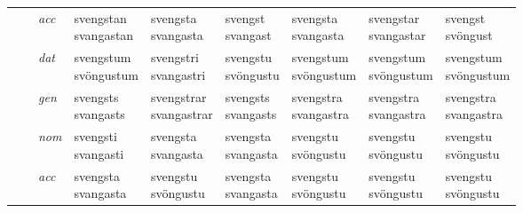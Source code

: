 \begin{longtable}{l>{\footnotesize\itshape}l>{\footnotesize\itshape}lXXXXXX}
 & & acc &  \specialcell{svengstan\\ svangastan} & \specialcell{svengsta\\ svangasta} & \specialcell{svengst\\ svangast} & \specialcell{svengsta\\ svangasta} & \specialcell{svengstar\\ svangastar} & \specialcell{svengst\\ svöngust} \\*
 & & dat & \specialcell{svengstum\\ svöngustum} & \specialcell{svengstri\\ svangastri} & \specialcell{svengstu\\ svöngustu} & \specialcell{svengstum\\ svöngustum} & \specialcell{svengstum\\ svöngustum} & \specialcell{svengstum\\ svöngustum} \\*
 & & gen & \specialcell{svengsts\\ svangasts} & \specialcell{svengstrar\\ svangastrar} & \specialcell{svengsts\\ svangasts} & \specialcell{svengstra\\ svangastra} & \specialcell{svengstra\\ svangastra} & \specialcell{svengstra\\ svangastra} \\
\cmidrule{2-9}
 &  \multirow{4}{*}{\begin{turn}{90}\textit{sup w}\end{turn}} & nom & \specialcell{svengsti\\ svangasti} & \specialcell{svengsta\\ svangasta} & \specialcell{svengsta\\ svangasta} & \specialcell{svengstu\\ svöngustu} & \specialcell{svengstu\\ svöngustu} & \specialcell{svengstu\\ svöngustu} \\*
 & & acc & \specialcell{svengsta\\ svangasta} & \specialcell{svengstu\\ svöngustu} & \specialcell{svengsta\\ svangasta} & \specialcell{svengstu\\ svöngustu} & \specialcell{svengstu\\ svöngustu} & \specialcell{svengstu\\ svöngustu} \\*

\end{longtable}
